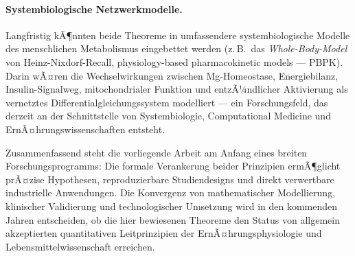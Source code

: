 ﻿\documentclass[12pt,a4paper]{article}
\theoremstyle{plain}
\theoremstyle{definition}
\theoremstyle{remark}
\begin{document}
\paragraph{Systembiologische Netzwerkmodelle.}
Langfristig kÃ¶nnten beide Theoreme in umfassendere
systembiologische Modelle des menschlichen Metabolismus eingebettet werden
(z.\,B.\ das \textit{Whole-Body-Model} von Heinz-Nixdorf-Recall,
physiology-based pharmacokinetic models --- PBPK). Darin wÃ¤ren die
Wechselwirkungen zwischen Mg-Homeostase, Energiebilanz, Insulin-Signalweg,
mitochondrialer Funktion und entzÃ¼ndlicher Aktivierung als vernetztes
Differentialgleichungssystem modelliert --- ein Forschungsfeld, das
derzeit an der Schnittstelle von Systembiologie, Computational Medicine
und ErnÃ¤hrungswissenschaften entsteht.

\bigskip
\noindent
Zusammenfassend steht die vorliegende Arbeit am Anfang eines breiten
Forschungsprogramms: Die formale Verankerung beider Prinzipien ermÃ¶glicht
prÃ¤zise Hypothesen, reproduzierbare Studiendesigns und direkt verwertbare
industrielle Anwendungen. Die Konvergenz von mathematischer Modellierung,
klinischer Validierung und technologischer Umsetzung wird in den kommenden
Jahren entscheiden, ob die hier bewiesenen Theoreme den Status von
allgemein akzeptierten quantitativen Leitprinzipien der
ErnÃ¤hrungsphysiologie und Lebensmittelwissenschaft erreichen.
\end{document}
